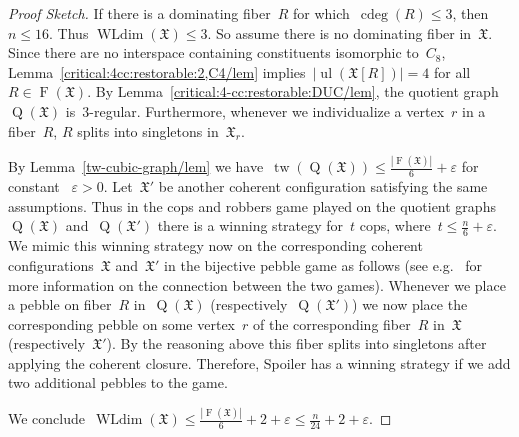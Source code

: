 \documentclass[english,a4paper]{article}
\theoremstyle{plain}
\theoremstyle{definition}
\newcommand{\abs}[1]{| #1 |}
\DeclareMathOperator{\Fibers}{F}
\newcommand{\coherentConfig}{\ensuremath{\mathfrak{X}}}
\newcommand{\fibers}[1]{\ensuremath{\Fibers \left( #1 \right)}}
\newcommand{\inducedCC}[1]{\ensuremath{\coherentConfig[#1]}}
\DeclareMathOperator*{\ul}{ul}
\DeclareMathOperator*{\WLdim}{WLdim}
\newcommand{\wldim}[1]{\ensuremath{\WLdim\left(#1\right)}}
\DeclareMathOperator*{\Quotient}{Q}
\newcommand{\quotientGraph}[1]{\ensuremath{\Quotient(#1)}}
\DeclareMathOperator{\ColorDeg}{cdeg}
\newcommand{\colorDeg}[1]{\ensuremath{\ColorDeg\left(#1\right)}}
\DeclareMathOperator{\treewidth}{tw}
\newcommand{\cycle}[1]{\ensuremath{C_{#1}}}
\begin{document}
\begin{proof}[Proof Sketch]
    If there is a dominating fiber~$R$ for which~$\colorDeg{R} \leq 3$, then~$n\leq 16$.
    Thus $\wldim{\coherentConfig} \leq 3$.
    So assume there is no dominating fiber in~$\coherentConfig$.
    Since there are no interspace containing constituents isomorphic to~$\cycle{8}$, Lemma~\ref{critical:4cc:restorable:2,C4/lem} implies~$|\ul(\inducedCC{R})| = 4$ for all~$R \in \fibers{\coherentConfig}$.
    By Lemma~\ref{critical:4-cc:restorable:DUC/lem}, the quotient graph~$\quotientGraph{\coherentConfig}$ is~$3$-regular.
    Furthermore, whenever we individualize a vertex~$r$ in a fiber~$R$, $R$ splits into singletons in~$\coherentConfig_r$.

    By Lemma~\ref{tw-cubic-graph/lem} we have~$\treewidth(\quotientGraph{\coherentConfig}) \leq \frac{\abs{\fibers{\coherentConfig}}}{6} + \varepsilon$ for constant ~$\varepsilon > 0$.
    Let~$\coherentConfig'$ be another coherent configuration satisfying the same assumptions.
    Thus in the cops and robbers game played on the quotient graphs~$\quotientGraph{\coherentConfig}$ and~$\quotientGraph{\coherentConfig'}$ there is a winning strategy for~$t$ cops, where~$t \leq \frac{n}{6} + \varepsilon$.
    We mimic this winning strategy now on the corresponding coherent configurations~$\coherentConfig$ and~$\coherentConfig'$ in the bijective pebble game as follows (see e.g.~\cite{DBLP:conf/swat/OtachiS14} for more information on the connection between the two games).
    Whenever we place a pebble on fiber~$R$ in~$\quotientGraph{\coherentConfig}$ (respectively~$\quotientGraph{\coherentConfig'}$) we now place the corresponding pebble on some vertex~$r$ of the corresponding fiber~$R$ in~$\coherentConfig$ (respectively~$\coherentConfig'$).
    By the reasoning above this fiber splits into singletons after applying the coherent closure.
    Therefore, Spoiler has a winning strategy if we add two additional pebbles to the game.

    We conclude~$\wldim{\coherentConfig} \leq \frac{\abs{\fibers{\coherentConfig}}}{6} + 2 + \varepsilon \leq \frac{n}{24} + 2 + \varepsilon$.
\end{proof}
\end{document}
